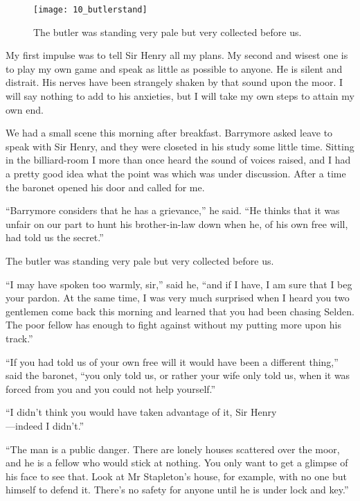 \begin{wrapfigure}[18]{O}{0.6\textwidth}
\centering
\texttt{[image: 10\_butlerstand]}
\caption{The butler was standing very pale but very collected before us.}
\end{wrapfigure}

My first impulse was to tell Sir Henry all my plans. My second and wisest one is to play my own game and speak as little as possible to anyone. He is silent and distrait. His nerves have been strangely shaken by that sound upon the moor. I will say nothing to add to his anxieties, but I will take my own steps to attain my own end.

We had a small scene this morning after breakfast. Barrymore asked leave to speak with Sir Henry, and they were closeted in his study some little time. Sitting in the billiard-room I more than once heard the sound of voices raised, and I had a pretty good idea what the point was which was under discussion. After a time the baronet opened his door and called for me.

\enquote{Barrymore considers that he has a grievance,} he said. \enquote{He thinks that it was unfair on our part to hunt his brother-in-law down when he, of his own free will, had told us the secret.}

The butler was standing very pale but very collected before us.


\enquote{I may have spoken too warmly, sir,} said he, \enquote{and if I have, I am sure that I beg your pardon. At the same time, I was very much surprised when I heard you two gentlemen come back this morning and learned that you had been chasing Selden. The poor fellow has enough to fight against without my putting more upon his track.}

\enquote{If you had told us of your own free will it would have been a different thing,} said the baronet, \enquote{you only told us, or rather your wife only told us, when it was forced from you and you could not help yourself.}

\enquote{I didn't think you would have taken advantage of it, Sir Henry\\ ---indeed I didn't.}

\enquote{The man is a public danger. There are lonely houses scattered over the moor, and he is a fellow who would stick at nothing. You only want to get a glimpse of his face to see that. Look at Mr Stapleton's house, for example, with no one but himself to defend it. There's no safety for anyone until he is under lock and key.}

